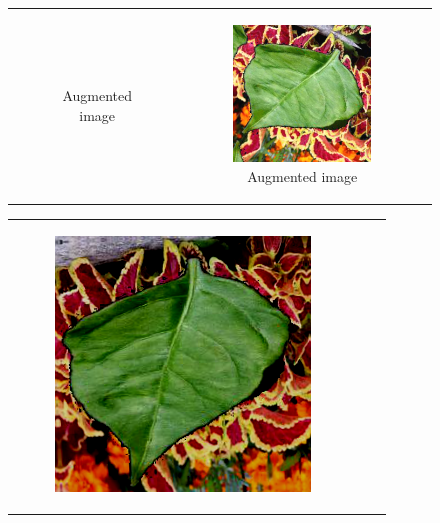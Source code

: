 \documentclass{BachelorBUI}
\begin{document}
\begin{figure}[!h]
\begin{tabular}{ccc}
\begin{subfigure}{0.30\textwidth}
                    \caption{\centering Augmented image}
                \end{subfigure} &
                \begin{subfigure}{0.30\textwidth}
                    \centering
                    \includegraphics[width=\textwidth]{2_pipeline.png}
                    \caption{\centering Augmented image}
                \end{subfigure} \\
            \end{tabular}
            \begin{tabular}{ccc}
                \begin{subfigure}{0.30\textwidth}
                    \centering
                    \includegraphics[width=\textwidth]{3_pipeline.png}

\end{subfigure}
\end{tabular}
\end{figure}
\end{document}
